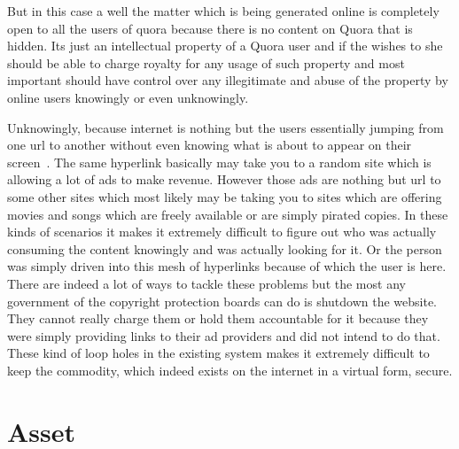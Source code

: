 But in this case a well the matter which is being generated online is
completely open to all the users of quora because there is no content
on Quora that is hidden. Its just an intellectual property of a Quora
user and if the wishes to she should be able to charge royalty for any
usage of such property and most important should have control over any
illegitimate and abuse of the property by online users knowingly or
even unknowingly.

Unknowingly, because internet is nothing but the users essentially
jumping from one url to another without even knowing what is about to
appear on their screen~\cite{jane3}. The same hyperlink basically may
take you to a random site which is allowing a lot of ads to make
revenue. However those ads are nothing but url to some other sites
which most likely may be taking you to sites which are offering movies
and songs which are freely available or are simply pirated copies. In
these kinds of scenarios it makes it extremely difficult to figure out
who was actually consuming the content knowingly and was actually
looking for it. Or the person was simply driven into this mesh of
hyperlinks because of which the user is here. There are indeed a lot
of ways to tackle these problems but the most any government of the
copyright protection boards can do is shutdown the website. They
cannot really charge them or hold them accountable for it because they
were simply providing links to their ad providers and did not intend
to do that. These kind of loop holes in the existing system makes it
extremely difficult to keep the commodity, which indeed exists on the
internet in a virtual form, secure.

\section{Asset}

